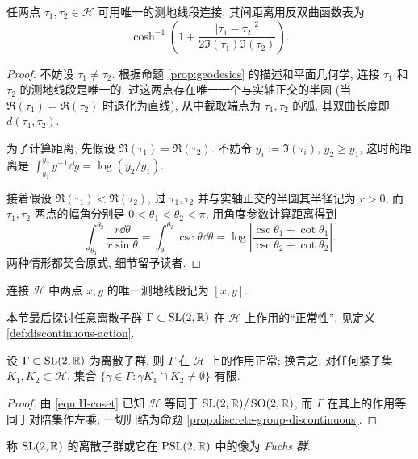 \begin{proposition}\label{prop:hyperbolic-distance}
	任两点 $\tau_1, \tau_2 \in \mathcal{H}$ 可用唯一的测地线段连接, 其间距离用反双曲函数表为
	\[ \cosh^{-1} \left( 1 + \dfrac{|\tau_1 - \tau_2|^2}{2\Im(\tau_1) \Im(\tau_2)} \right).  \]
\end{proposition}
\begin{proof}
	不妨设 $\tau_1 \neq \tau_2$. 根据命题 \ref{prop:geodesics} 的描述和平面几何学, 连接 $\tau_1$ 和 $\tau_2$ 的测地线段是唯一的: 过这两点存在唯一一个与实轴正交的半圆 (当 $\Re(\tau_1) = \Re(\tau_2)$ 时退化为直线), 从中截取端点为 $\tau_1, \tau_2$ 的弧, 其双曲长度即 $d(\tau_1, \tau_2)$.

	为了计算距离, 先假设 $\Re(\tau_1) = \Re(\tau_2)$. 不妨令 $y_i := \Im(\tau_i)$, $y_2 \geq y_1$, 这时的距离是 $\int_{y_1}^{y_2} y^{-1} \dd y = \log(y_2/y_1)$.
	
	接着假设 $\Re(\tau_1) < \Re(\tau_2)$, 过 $\tau_1, \tau_2$ 并与实轴正交的半圆其半径记为 $r > 0$, 而 $\tau_1, \tau_2$ 两点的幅角分别是 $0 < \theta_1 < \theta_2 < \pi$, 用角度参数计算距离得到
	\[ \int_{\theta_1}^{\theta_2} \dfrac{r\dd\theta}{r\sin\theta} = \int_{\theta_1}^{\theta_2} \csc\theta \dd\theta = \log\left| \dfrac{ \csc\theta_1 + \cot\theta_1 }{ \csc\theta_2 + \cot\theta_2 } \right|. \]
	两种情形都契合原式, 细节留予读者.
\end{proof}

\begin{convention}\label{conv:geodesic-segment} \index[sym1]{$[x,y]$}
	连接 $\mathcal{H}$ 中两点 $x,y$ 的唯一测地线段记为 $[x,y]$.
\end{convention}

本节最后探讨任意离散子群 $\Gamma \subset \operatorname{SL}(2,\mathbb{R})$ 在 $\mathcal{H}$ 上作用的``正常性'', 见定义 \ref{def:discontinuous-action}.
\begin{proposition}\label{prop:discrete-group-discontinuous-SL}
	设 $\Gamma \subset \operatorname{SL}(2,\mathbb{R})$ 为离散子群, 则 $\Gamma$ 在 $\mathcal{H}$ 上的作用正常; 换言之, 对任何紧子集 $K_1, K_2 \subset \mathcal{H}$, 集合 $\{\gamma \in \Gamma : \gamma K_1 \cap K_2 \neq \emptyset \}$ 有限.
\end{proposition}
\begin{proof}
	由 \eqref{eqn:H-coset} 已知 $\mathcal{H}$ 等同于 $\operatorname{SL}(2,\mathbb{R})/\operatorname{SO}(2,\mathbb{R})$, 而 $\Gamma$ 在其上的作用等同于对陪集作左乘; 一切归结为命题 \ref{prop:discrete-group-discontinuous}.
\end{proof}

\begin{convention} 
	称 $\operatorname{SL}(2,\mathbb{R})$ 的离散子群或它在 $\operatorname{PSL}(2,\mathbb{R})$ 中的像为 \emph{Fuchs 群}.
\end{convention}

